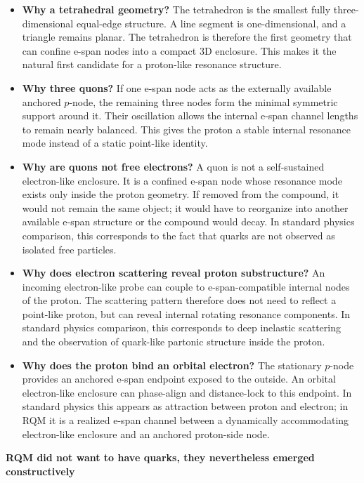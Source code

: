 \documentclass[11pt,a4paper]{article}
\begin{document}
\begin{itemize}
\item \textbf{Why a tetrahedral geometry?}
The tetrahedron is the smallest fully three-dimensional equal-edge structure. A line segment is one-dimensional, and a triangle remains planar. The tetrahedron is therefore the first geometry that can confine e-span nodes into a compact 3D enclosure. This makes it the natural first candidate for a proton-like resonance structure.
\item \textbf{Why three quons?}  
If one e-span node acts as the externally available anchored \(p\)-node, the remaining three nodes form the minimal symmetric support around it. Their oscillation allows the internal e-span channel lengths to remain nearly balanced. This gives the proton a stable internal resonance mode instead of a static point-like identity.
\item \textbf{Why are quons not free electrons?}  
A quon is not a self-sustained electron-like enclosure. It is a confined e-span node whose resonance mode exists only inside the proton geometry. If removed from the compound, it would not remain the same object; it would have to reorganize into another available e-span structure or the compound would decay. In standard physics comparison, this corresponds to the fact that quarks are not observed as isolated free particles.
\item \textbf{Why does electron scattering reveal proton substructure?}  
An incoming electron-like probe can couple to e-span-compatible internal nodes of the proton. The scattering pattern therefore does not need to reflect a point-like proton, but can reveal internal rotating resonance components. In standard physics comparison, this corresponds to deep inelastic scattering and the observation of quark-like partonic structure inside the proton.
\item \textbf{Why does the proton bind an orbital electron?}  
The stationary \(p\)-node provides an anchored e-span endpoint exposed to the outside. An orbital electron-like enclosure can phase-align and distance-lock to this endpoint. In standard physics this appears as attraction between proton and electron; in RQM it is a realized e-span channel between a dynamically accommodating electron-like enclosure and an anchored proton-side node.

\end{itemize}

\item \textbf{RQM did not want to have quarks, they nevertheless emerged constructively}  
\end{document}
